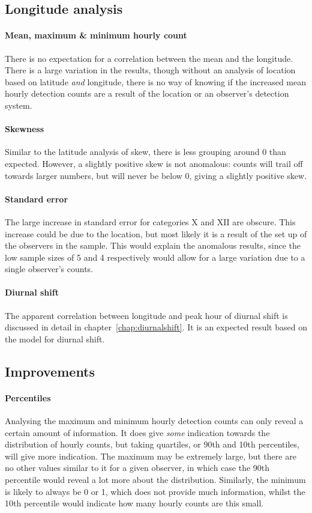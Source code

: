 \subsection{Longitude analysis}
\paragraph{Mean, maximum \& minimum hourly count\\}
There is no expectation for a correlation between the mean and the longitude. There is a large variation in the results, though without an analysis of location based on latitude {\it and} longitude, there is no way of knowing if the increased mean hourly detection counts are a result of the location or an observer's detection system.
\paragraph{Skewness\\}
Similar to the latitude analysis of skew, there is less grouping around 0 than expected. However, a slightly positive skew is not anomalous: counts will trail off towards larger numbers, but will never be below 0, giving a slightly positive skew.
\paragraph{Standard error\\}
The large increase in standard error for categories X and XII are obscure. This increase could be due to the location, but most likely it is a result of the set up of the observers in the sample. This would explain the anomalous results, since the low sample sizes of 5 and 4 respectively would allow for a large variation due to a single observer's counts.
\paragraph{Diurnal shift\\}
The apparent correlation between longitude and peak hour of diurnal shift is discussed in detail in chapter~\ref{chap:diurnalshift}. It is an expected result based on the model for diurnal shift.
\subsection{Improvements}
\paragraph{Percentiles\\}
Analysing the maximum and minimum hourly detection counts can only reveal a certain amount of information. It does give {\it some} indication towards the distribution of hourly counts, but taking quartiles, or 90th and 10th percentiles, will give more indication. The maximum may be extremely large, but there are no other values similar to it for a given observer, in which case the 90th percentile would reveal a lot more about the distribution. Similarly, the minimum is likely to always be 0 or 1, which does not provide much information, whilst the 10th percentile would indicate how many hourly counts are this small.
